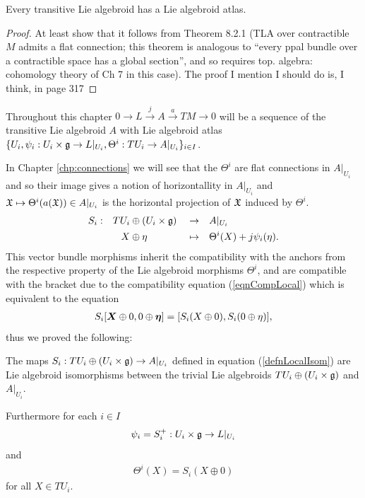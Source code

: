 \begin{theorem}
Every transitive Lie algebroid has a Lie algebroid atlas.
\end{theorem}
\begin{proof}
At least show that it follows from Theorem 8.2.1 (TLA over contractible $M$ admits a flat connection; this theorem is analogous to ``every ppal bundle over a contractible space has a global section'', and so requires top. algebra: cohomology theory of Ch 7 in this case). The proof I mention I should do is, I think, in page 317
\end{proof}

Throughout this chapter $0 \to L \xrightarrow{j} A \xrightarrow{a} TM \to 0$ will be a sequence of the transitive Lie algebroid $A$ with Lie algebroid atlas $\{U_i, \psi_i:U_i \times \mathfrak{g}\to L|_{U_i}, \Theta^i:TU_i \to A|_{U_i}\}_{i \in I}$.

In Chapter \ref{chp:connections} we will see that the $\Theta^i$ are flat connections in $A|_{U_i}$ and so their image gives a notion of horizontallity in $A|_{U_i}$ and $ \mathfrak{X} \mapsto \Theta^i(a(\mathfrak{X})) \in A|_{U_i}$ is the horizontal projection of $\mathfrak{X}$ induced by $\Theta^i$.
\begin{align}\label{defnLocalIsom}
    S_i:&& TU_i &\oplus (U_i \times \mathfrak{g}) &&\to&& A|_{U_i}\\
        && X &\oplus \eta && \mapsto && \Theta^i(X) + j\psi_i(\eta).
\end{align}
This vector bundle morphisms inherit the compatibility with the anchors from the respective property of the Lie algebroid morphisms $\Theta^i$, and are compatible with the bracket due to the compatibility equation (\ref{eqnCompLocal}) which is equivalent to the equation
\begin{align*}
    S_i[\bm{X} \oplus 0, 0 \oplus \bm{\eta}] = [S_i(X \oplus 0), S_i(0 \oplus \eta)],
\end{align*} thus we proved the following:

\begin{theorem}
The maps $S_i : TU_i \oplus (U_i \times \mathfrak{g}) \to A|_{U_i}$ defined in equation (\ref{defnLocalIsom}) are Lie algebroid isomorphisms between the trivial Lie algebroids $TU_i \oplus (U_i \times \mathfrak{g})$ and $A|_{U_i}$.

Furthermore for each $i \in I$ 
\begin{align*}
    \psi_i = S_i^+: U_i \times \mathfrak{g} \to L|_{U_i}
\end{align*} and 
\begin{align*}
    \Theta^i(X) = S_i(X \oplus 0)
\end{align*}
for all $X \in TU_i$.
\end{theorem}

